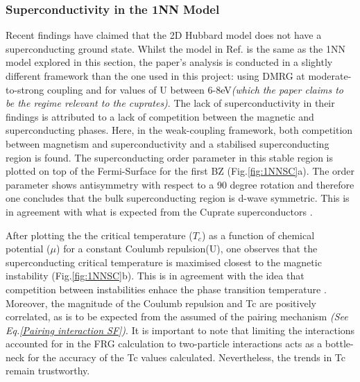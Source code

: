 \documentclass[12pt]{article}
\begin{document}
\subsubsection{Superconductivity in the 1NN Model}

Recent findings have claimed that the 2D Hubbard model does not have a superconducting ground state\cite{qin2020absence}. 
Whilst the model in Ref. \cite{qin2020absence} is the same as the 1NN model explored in this section, the paper's analysis is conducted in a 
slightly different framework than the one used in this project: using DMRG \cite{white1992density} 
at moderate-to-strong coupling and for values of U between 6-8eV\textit{(which the paper claims to be the 
regime relevant to the cuprates)}.
The lack of superconductivity in their findings is attributed to a lack of competition 
between the magnetic and superconducting phases. Here, in the weak-coupling framework, both  competition between magnetism and superconductivity and 
a stabilised superconducting region is found. The superconducting order parameter in this stable region is plotted on top of the Fermi-Surface for the first BZ (Fig.\ref{fig:1NNSC}a).
The order parameter shows antisymmetry with respect to a 90 degree rotation and therefore one concludes that
the bulk superconducting region is d-wave symmetric. This is in agreement with what is expected from the Cuprate superconductors \cite{tsuei2000pairing}.\par
\medskip
\noindent 
After plotting the the critical temperature ($T_c$) as a function of chemical potential ($\mu$) for a constant Coulumb repulsion(U), one observes that
the superconducting critical temperature is maximised closest to the magnetic instability (Fig.\ref{fig:1NNSC}b).
This is in agreement with the idea that competition between instabilities
enhace the phase transition temperature \cite{maple1995interplay,sun2016dome}. Moreover, the magnitude of the Coulumb repulsion and Tc are positively correlated, as is to be expected from the assumed 
of the pairing mechanism \textit{(See Eq.\ref{Pairing interaction SF})}.
It is important to note that limiting the interactions 
accounted for in the FRG calculation to two-particle interactions acts as a bottle-neck for the accuracy 
of the Tc values calculated. Nevertheless, the trends in Tc remain trustworthy. 
\end{document}
